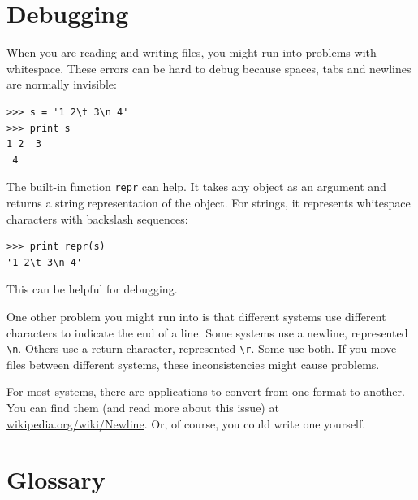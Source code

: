 \documentclass[10pt]{book}
\begin{document}


\section{Debugging}


When you are reading and writing files, you might run into problems
with whitespace.  These errors can be hard to debug because spaces,
tabs and newlines are normally invisible:

\beforeverb
\begin{verbatim}
>>> s = '1 2\t 3\n 4'
>>> print s
1 2	 3
 4
\end{verbatim}
\afterverb


The built-in function {\tt repr} can help.  It takes any object as an
argument and returns a string representation of the object.  For
strings, it represents whitespace
characters with backslash sequences:

\beforeverb
\begin{verbatim}
>>> print repr(s)
'1 2\t 3\n 4'
\end{verbatim}
\afterverb

This can be helpful for debugging.

One other problem you might run into is that different systems
use different characters to indicate the end of a line.  Some
systems use a newline, represented \verb"\n".  Others use
a return character, represented \verb"\r".  Some use both.
If you move files between different systems, these inconsistencies
might cause problems.


For most systems, there are applications to convert from one
format to another.  You can find them (and read more about this
issue) at \url{wikipedia.org/wiki/Newline}.  Or, of course, you
could write one yourself.


\section{Glossary}
\end{document}
